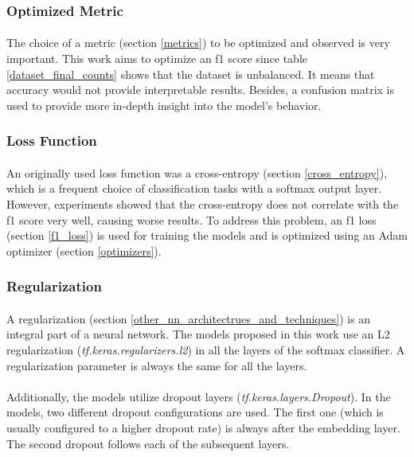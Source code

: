 \subsubsection{Optimized Metric}
\paragraph{}
The choice of a metric (section \ref{metrics}) to be optimized and observed is very important. This work aims to optimize an f1 score since table \ref{dataset_final_counts} shows that the dataset is unbalanced. It means that accuracy would not provide interpretable results. Besides, a confusion matrix is used to provide more in-depth insight into the model’s behavior.

\subsubsection{Loss Function}
\paragraph{}
An originally used loss function was a cross-entropy (section \ref{cross_entropy}), which is a frequent choice of classification tasks with a softmax output layer. However, experiments showed that the cross-entropy does not correlate with the f1 score very well, causing worse results. To address this problem, an f1 loss (section \ref{f1_loss}) is used for training the models and is optimized using an Adam optimizer (section \ref{optimizers}). 

\subsubsection{Regularization}
\paragraph{}
A regularization (section \ref{other_nn_architectrues_and_techniques}) is an integral part of a neural network. The models proposed in this work use an L2 regularization (\textit{tf.keras.regularizers.l2}) in all the layers of the softmax classifier. A regularization parameter is always the same for all the layers.

\paragraph{}
Additionally, the models utilize dropout layers (\textit{tf.keras.layers.Dropout}). In the models, two different dropout configurations are used. The first one (which is usually configured to a higher dropout rate) is always after the embedding layer. The second dropout follows each of the subsequent layers.

